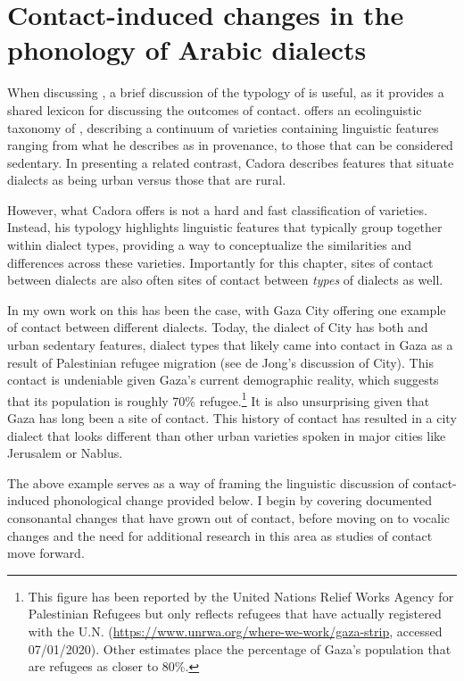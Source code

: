 \documentclass[output=paper]{langsci/langscibook}
\begin{document}
\section{Contact-induced changes in the phonology of Arabic dialects}

When discussing  , a brief discussion of the typology of  is useful, as it provides a shared lexicon for discussing the outcomes of contact. \citet{Cadora1992} offers an ecolinguistic taxonomy of , describing a continuum of  varieties containing linguistic features ranging from what he describes as  in provenance, to those that can be considered sedentary. In presenting a related contrast, Cadora describes features that situate dialects as being urban versus those that are rural. 

  However, what Cadora offers is not a hard and fast classification of  varieties. Instead, his typology highlights linguistic features that typically group together within dialect types, providing a way to conceptualize the similarities and differences across these varieties. Importantly for this chapter, sites of contact between  dialects are also often sites of contact between \textit{types} of dialects as well. 

  In my own work on   this has been the case, with Gaza City offering one example of contact between different   dialects. Today, the dialect of  City has both  and urban sedentary features, dialect types that likely came into contact in Gaza as a result of Palestinian refugee migration (see de Jong's \citeyear{DeJong2000} discussion of  City). This contact is undeniable given Gaza’s current demographic reality, which suggests that its population is roughly 70\% refugee.\footnote{This figure has been reported by the United Nations Relief Works Agency for Palestinian Refugees but only reflects refugees that have actually registered with the U.N. (\url{https://www.unrwa.org/where-we-work/gaza-strip}, accessed 07/01/2020). Other estimates place the percentage of Gaza’s population that are refugees as closer to 80\%.}  It is also unsurprising given that Gaza has long been a site of contact. This history of contact has resulted in a city dialect that looks different than other urban  varieties spoken in major cities like {Jerusalem} or Nablus. 

  The above example serves as a way of framing the linguistic discussion of contact-induced phonological change provided below. I begin by covering documented consonantal changes that have grown out of contact, before moving on to vocalic changes and the need for additional research in this area as studies of  contact move forward. 
\end{document}
